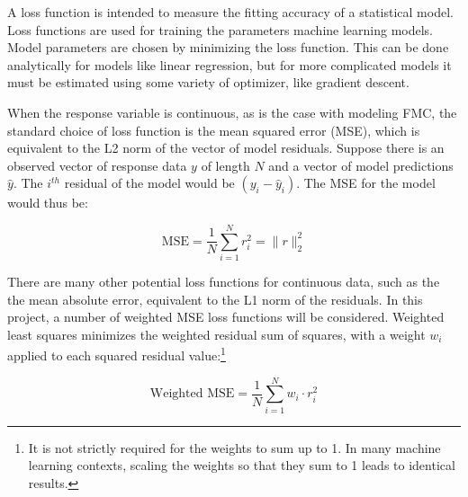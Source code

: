\documentclass[11pt]{article}%
\begin{document}
A loss function is intended to measure the fitting accuracy of a statistical model. Loss functions are used for training the parameters machine learning models. Model parameters are chosen by minimizing the loss function. This can be done analytically for models like linear regression, but for more complicated models it must be estimated using some variety of optimizer, like gradient descent. 

When the response variable is continuous, as is the case with modeling FMC, the standard choice of loss function is the mean squared error (MSE), which is equivalent to the L2 norm of the vector of model residuals. Suppose there is an observed vector of response data $y$ of length $N$ and a vector of model predictions $\hat y$. The $i^{th}$ residual of the model would be $(y_i - \hat y_i)$. The MSE for the model would thus be:


\begin{equation}
    \label{eq:mse}
    \text{MSE} = \frac{1}{N}\sum_{i=1}^N r_i^2 = \|r\|_2^2
\end{equation}

There are many other potential loss functions for continuous data, such as the the mean absolute error, equivalent to the L1 norm of the residuals. In this project, a number of weighted MSE loss functions will be considered. Weighted least squares minimizes the weighted residual sum of squares, with a weight $w_i$ applied to each squared residual value:\footnote{It is not strictly required for the weights to sum up to 1. In many machine learning contexts, scaling the weights so that they sum to 1 leads to identical results.}


\begin{equation}
    \label{eq:wmse}
    \text{Weighted MSE} = \frac{1}{N}\sum_{i=1}^N w_i\cdot r_i^2
\end{equation}
\end{document}
